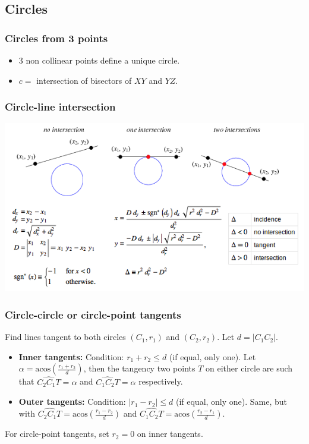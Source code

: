 \subsection{Circles}
\subsubsection{Circles from 3 points}
\begin{itemize}
\setlength\itemsep{-1em}
\item $3$ non collinear points define a unique circle.
\item $c = $ intersection of bisectors of $XY$ and $YZ$. 
\end{itemize}
\subsubsection{Circle-line intersection}

\begin{center}
\includegraphics[scale=0.45]{Geometrie/circleLine.png}
\end{center}

\subsubsection{Circle-circle or circle-point tangents}
\newcommand{\acos}{\mbox{acos}}
Find lines tangent to both circles $(C_1,r_1)$ and $(C_2,r_2)$. Let $d = |C_1C_2|$.
\begin{itemize}
\item{\bf Inner tangents:} Condition: $r_1+r_2 \leq d$ (if equal, only one). Let $\alpha = \acos(\frac{r_1+r_2}{d})$, then the tangency two points $T$ on either circle are such that $\widehat{C_2C_1T}=\alpha$ and $\widehat{C_1C_2T}=\alpha$ respectively.
\item{\bf Outer tangents:} Condition: $|r_1-r_2| \leq d$ (if equal, only one). Same, but with $\widehat{C_2C_1T}=\acos(\frac{r_1-r_2}{d})$ and $\widehat{C_1C_2T}=\acos(\frac{r_2-r_1}{d})$.
\end{itemize}
For circle-point tangents, set $r_2=0$ on inner tangents.
